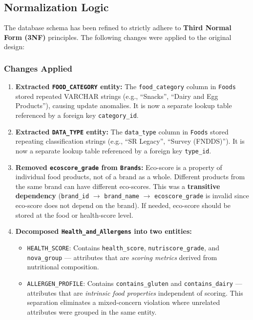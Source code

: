 \subsection{Normalization Logic}

The database schema has been refined to strictly adhere to \textbf{Third Normal Form (3NF)} principles. The following changes were applied to the original design:

\subsubsection{Changes Applied}

\begin{enumerate}
    \item \textbf{Extracted \texttt{FOOD\_CATEGORY} entity:} The \texttt{food\_category} column in \texttt{Foods} stored repeated VARCHAR strings (e.g., ``Snacks'', ``Dairy and Egg Products''), causing update anomalies. It is now a separate lookup table referenced by a foreign key \texttt{category\_id}.
    \item \textbf{Extracted \texttt{DATA\_TYPE} entity:} The \texttt{data\_type} column in \texttt{Foods} stored repeating classification strings (e.g., ``SR Legacy'', ``Survey (FNDDS)''). It is now a separate lookup table referenced by a foreign key \texttt{type\_id}.
    \item \textbf{Removed \texttt{ecoscore\_grade} from \texttt{Brands}:} Eco-score is a property of individual food products, not of a brand as a whole. Different products from the same brand can have different eco-scores. This was a \textbf{transitive dependency} (\texttt{brand\_id} $\rightarrow$ \texttt{brand\_name} $\rightarrow$ \texttt{ecoscore\_grade} is invalid since eco-score does not depend on the brand). If needed, eco-score should be stored at the food or health-score level.
    \item \textbf{Decomposed \texttt{Health\_and\_Allergens} into two entities:}
    \begin{itemize}
        \item \texttt{HEALTH\_SCORE}: Contains \texttt{health\_score}, \texttt{nutriscore\_grade}, and \texttt{nova\_group} — attributes that are \textit{scoring metrics} derived from nutritional composition.
        \item \texttt{ALLERGEN\_PROFILE}: Contains \texttt{contains\_gluten} and \texttt{contains\_dairy} — attributes that are \textit{intrinsic food properties} independent of scoring. This separation eliminates a mixed-concern violation where unrelated attributes were grouped in the same entity.
    \end{itemize}
\end{enumerate}

